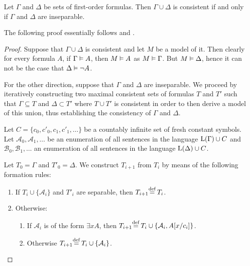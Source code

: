 \begin{thm}
	\label{thm:robinson}
	Let $\Gamma$ and $\Delta$ be sets of first-order formulas.
	Then $\Gamma \cup \Delta$ is consistent if and only if $\Gamma$ and $\Delta$ are inseparable.
\end{thm}
The following proof essentially follows \cite{Henkin63} and \cite{chang1990model}.
\begin{proof}
	Suppose that $\Gamma\cup\Delta$ is consistent and let $M$ be a model of it.
	Then clearly for every formula $A$, if $\Gamma \vDash A$, then $M \vDash A$ as $M \vDash \Gamma$.
	But $M \vDash \Delta$, hence it can not be the case that $\Delta \vDash \lnot A$.

	For the other direction, suppose that $\Gamma$ and $\Delta$ are inseparable.
	We proceed by iteratively constructing two maximal consistent sets of formulas $T$ and $T'$ such that $\Gamma \subseteq T$ and $\Delta \subset T'$ where $T \cup T'$ is consistent in order to then derive a model of this union, thus establishing the consistency of $\Gamma$ and $\Delta$.

	Let $C = \{c_0, c'_0, c_1, c'_1, \dots\}$ be
	a countably infinite set of fresh constant symbols.
	Let $\mathcal{A}_0, \mathcal{A}_1, \dots$ be an enumeration of all sentences in the language $\operatorname{L}(\Gamma) \cup C$
	and $\mathcal{B}_0, \mathcal{B}_1, \dots$ an enumeration of all sentences in the language $\operatorname{L}(\Delta) \cup C$.

	Let $T_0 = \Gamma$ and $T'_0 = \Delta$. 
	We construct
	$T_{i+1}$ 
	from
	$T_{i}$
	by means of the following formation rules:
	\begin{enumerate}[~~(1)]
		\item
			\label{theory_construction_1}
			If $T_{i} \cup \{\mathcal{A}_i\}$ and $T'_{i}$ are separable, then $T_{i+1} \defeq{}\, T_i$.
		\item Otherwise:
			\label{theory_construction_2}
			\begin{enumerate}[(2a)]
			\label{theory_construction_2a}
				\item If $\mathcal{A}_i$ is of the form $\exists x A$, then $T_{i+1} \defeq{}\, T_i \cup \{ \mathcal{A}_i, A\subst{x/c_i} \}$.
			\label{theory_construction_2b}
				\item Otherwise $T_{i+1} \defeq{}\, T_i \cup \{ \mathcal{A}_i \}$.
			\end{enumerate}
	\end{enumerate}


\end{proof}
